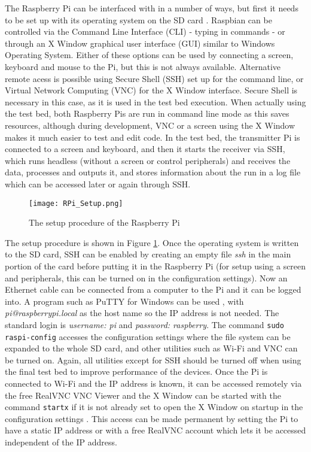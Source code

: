 \documentclass[../main.tex]{subfiles}
\begin{document}
\lstset{style=python}
The Raspberry Pi can be interfaced with in a number of ways, but first it needs to be set up with its operating system on the SD card \cite{web_SetupRaspbian}.
Raspbian can be controlled via the Command Line Interface (CLI) - typing in commands - or through an X Window graphical user interface (GUI) similar to Windows Operating System.
Either of these options can be used by connecting a screen, keyboard and mouse to the Pi, but this is not always available.
Alternative remote acess is possible using Secure Shell (SSH) set up for the command line, or Virtual Network Computing (VNC) for the X Window interface.
Secure Shell is necessary in this case, as it is used in the test bed execution.
When actually using the test bed, both Raspberry Pis are run in command line mode as this saves resources, although during development, VNC or a screen using the X Window makes it much easier to test and edit code.
In the test bed, the transmitter Pi is connected to a screen and keyboard, and then it starts the receiver via SSH, which runs headless (without a screen or control peripherals) and receives the data, processes and outputs it, and stores information about the run in a log file which can be accessed later or again through SSH.\\

\begin{figure}[ht]
	\centering
	\texttt{[image: RPi\_Setup.png]}
	\caption{The setup procedure of the Raspberry Pi}
	\label{fig_RPi Setup}
\end{figure}

The setup procedure is shown in Figure \ref{fig_RPi Setup}.
Once the operating system is written to the SD card, SSH can be enabled by creating an empty file \textit{ssh} in the main portion of the card before putting it in the Raspberry Pi (for setup using a screen and peripherals, this can be turned on in the configuration settings).
Now an Ethernet cable can be connected from a computer to the Pi and it can be logged into.
A program such as PuTTY for Windows can be used \cite{lib_PuTTY}, with \textit{pi@raspberrypi.local} as the host name so the IP address is not needed.
The standard login is \textit{username: pi} and \textit{password: raspberry}.
The command \colorbox{backcolour}{\lstinline{sudo raspi-config}} accesses the configuration settings where the file system can be expanded to the whole SD card, and other utilities such as Wi-Fi and VNC can be turned on.
Again, all utilities except for SSH should be turned off when using the final test bed to improve performance of the devices.
Once the Pi is connected to Wi-Fi and the IP address is known, it can be accessed remotely via the free RealVNC VNC Viewer and the X Window can be started with the command \colorbox{backcolour}{\lstinline{startx}} if it is not already set to open the X Window on startup in the configuration settings \cite{lib_RealVNCViewer}.
This access can be made permanent by setting the Pi to have a static IP address or with a free RealVNC account which lets it be accessed independent of the IP address.\\
\end{document}
